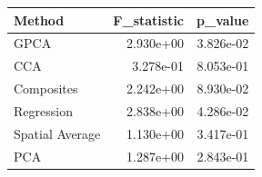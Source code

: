 \begin{tabular}{lrr}
\toprule
Method & F_statistic & p_value \\
\midrule
GPCA & 2.930e+00 & 3.826e-02 \\
CCA & 3.278e-01 & 8.053e-01 \\
Composites & 2.242e+00 & 8.930e-02 \\
Regression & 2.838e+00 & 4.286e-02 \\
Spatial Average & 1.130e+00 & 3.417e-01 \\
PCA & 1.287e+00 & 2.843e-01 \\
\bottomrule
\end{tabular}
